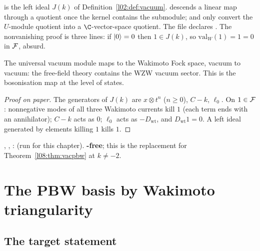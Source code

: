 \begin{dictionary}
 is the left ideal $J(k)$ of Definition~\ref{l02:def:vacuum}.  descends a
linear map through a quotient once the kernel contains the submodule;  and
 only convert the $U$-module quotient into a $\C$-vector-space quotient. The
file declares . The nonvanishing proof is three lines: if
$|0\rangle=0$ then $1\in J(k)$, so $\mathrm{val}_W(1) = 1 = 0$ in $\mathcal{F}$, absurd.
\end{dictionary}

\begin{physics}
The universal vacuum module maps to the Wakimoto Fock space, vacuum to vacuum: the free-field theory
contains the WZW vacuum sector. This is the bosonisation map at the level of states.
\end{physics}

\begin{proof}[Proof on paper]
The generators of $J(k)$ are $x\otimes t^n$ ($n\ge0$), $C-k$, $\ell_0$. On $1\in\mathcal{F}$:
nonnegative modes of all three Wakimoto currents kill $1$ (each term ends with an annihilator);
$C-k$ acts as $0$; $\ell_0$ acts as $-D_{\mathrm{wt}}$, and $D_{\mathrm{wt}}1=0$. A left ideal generated
by elements killing $1$ kills $1$.
\end{proof}

\begin{status}
\allowbreak{}\allowbreak{}\allowbreak{}, \allowbreak{}\allowbreak{}\allowbreak{}\allowbreak{}\allowbreak{},
\allowbreak{}\allowbreak{}\allowbreak{}: \lean{[propext, Classical.}\allowbreak{}\allowbreak\lean{sound]}
(run for this chapter). \textbf{-free}; this is the replacement for
Theorem~\ref{l08:thm:vacpbw} at $k\ne-2$.
\end{status}

\section{The PBW basis by Wakimoto triangularity}\label{l08:sec:pbw}

\subsection{The target statement}

